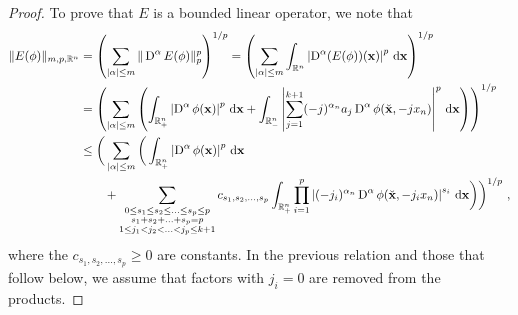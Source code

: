 \begin{proof}
To prove that $E$ is a bounded linear operator, we note that
\begin{align*}
\| E(\phi) \|_{m,p,\mathbb{R}^n}
&= \left( \sum_{|\alpha|\leq m} \|\operatorname{D}^\alpha E(\phi)\|_p^p \right)^{1/p}
= \left( \sum_{|\alpha|\leq m} \int_{\mathbb{R}^n}
\left|\operatorname{D}^\alpha (E(\phi))(\mathbf{x}) \right|^p \,\mathrm{d}{\mathbf{x}} \right)^{1/p} \\
&= \left( \sum_{|\alpha|\leq m} \left( \int_{\mathbb{R}^n_+}
\left|\operatorname{D}^\alpha \phi(\mathbf{x}) \right|^p \,\mathrm{d}{\mathbf{x}}
+ \int_{\mathbb{R}^n_-} \left|\sum_{j=1}^{k+1} (-j)^{\alpha_n} a_j
\operatorname{D}^\alpha \phi(\breve{\mathbf{x}},-j x_n)\right|^p \,\mathrm{d}{\mathbf{x}}
\right) \right)^{1/p} \\
&\leq \bigg( \sum_{|\alpha|\leq m} \bigg( \int_{\mathbb{R}^n_+}
\left|\operatorname{D}^\alpha \phi(\mathbf{x}) \right|^p \,\mathrm{d}{\mathbf{x}} \\
&\qquad + \sum_{\substack{0\leq s_1 \leq s_2 \leq \ldots \leq s_p \leq p\\
  s_1+s_2+\ldots+s_p = p\\
  1\leq j_1 < j_2 < \ldots <j_p \leq k+1}} c_{s_1,s_2,\ldots,s_p}
  \int_{\mathbb{R}^n_+} \prod_{i=1}^p \left| (-j_i)^{\alpha_n} \operatorname{D}^\alpha
\phi(\breve{\mathbf{x}},-j_i x_n)\right|^{s_i} \,\mathrm{d}{\mathbf{x}}
\bigg) \bigg)^{1/p} \ ,
\end{align*}
where the $c_{s_1,s_2,\ldots,s_p} \geq 0$ are constants.
In the previous relation and those that follow below, we assume that
factors with $j_i=0$ are removed from the products.


\end{proof}
